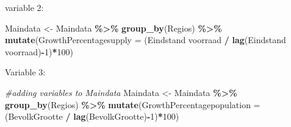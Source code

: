 \documentclass[
]{article}
\newenvironment{Shaded}{\begin{snugshade}}{\end{snugshade}}
\newcommand{\AttributeTok}[1]{\textcolor[rgb]{0.13,0.29,0.53}{#1}}
\newcommand{\CommentTok}[1]{\textcolor[rgb]{0.56,0.35,0.01}{\textit{#1}}}
\newcommand{\DecValTok}[1]{\textcolor[rgb]{0.00,0.00,0.81}{#1}}
\newcommand{\DocumentationTok}[1]{\textcolor[rgb]{0.56,0.35,0.01}{\textbf{\textit{#1}}}}
\newcommand{\FunctionTok}[1]{\textcolor[rgb]{0.13,0.29,0.53}{\textbf{#1}}}
\newcommand{\NormalTok}[1]{#1}
\newcommand{\OtherTok}[1]{\textcolor[rgb]{0.56,0.35,0.01}{#1}}
\newcommand{\SpecialCharTok}[1]{\textcolor[rgb]{0.81,0.36,0.00}{\textbf{#1}}}
\newcommand{\StringTok}[1]{\textcolor[rgb]{0.31,0.60,0.02}{#1}}
\begin{document}
\begin{Shaded}
\end{Shaded}

variable 2:

\begin{Shaded}
\begin{Highlighting}[]
\NormalTok{Maindata }\OtherTok{\textless{}{-}}\NormalTok{ Maindata }\SpecialCharTok{\%\textgreater{}\%}
  \FunctionTok{group\_by}\NormalTok{(}\StringTok{\textasciigrave{}}\AttributeTok{Regio\textquotesingle{}s}\StringTok{\textasciigrave{}}\NormalTok{) }\SpecialCharTok{\%\textgreater{}\%}
  \FunctionTok{mutate}\NormalTok{(}\AttributeTok{GrowthPercentagesupply =}\NormalTok{ (}\StringTok{\textasciigrave{}}\AttributeTok{Eindstand voorraad}\StringTok{\textasciigrave{}} \SpecialCharTok{/} \FunctionTok{lag}\NormalTok{(}\StringTok{\textasciigrave{}}\AttributeTok{Eindstand voorraad}\StringTok{\textasciigrave{}}\NormalTok{)}\SpecialCharTok{{-}}\DecValTok{1}\NormalTok{)}\SpecialCharTok{*}\DecValTok{100}\NormalTok{)}
\end{Highlighting}
\end{Shaded}

Variable 3:

\begin{Shaded}
\begin{Highlighting}[]
\CommentTok{\#adding variables to Maindata }
\NormalTok{Maindata }\OtherTok{\textless{}{-}}\NormalTok{ Maindata }\SpecialCharTok{\%\textgreater{}\%}
  \FunctionTok{group\_by}\NormalTok{(}\StringTok{\textasciigrave{}}\AttributeTok{Regio\textquotesingle{}s}\StringTok{\textasciigrave{}}\NormalTok{) }\SpecialCharTok{\%\textgreater{}\%}
  \FunctionTok{mutate}\NormalTok{(}\AttributeTok{GrowthPercentagepopulation =}\NormalTok{ (BevolkGrootte }\SpecialCharTok{/} \FunctionTok{lag}\NormalTok{(BevolkGrootte)}\SpecialCharTok{{-}}\DecValTok{1}\NormalTok{)}\SpecialCharTok{*}\DecValTok{100}\NormalTok{)}
\end{Highlighting}
\end{Shaded}
\end{document}
